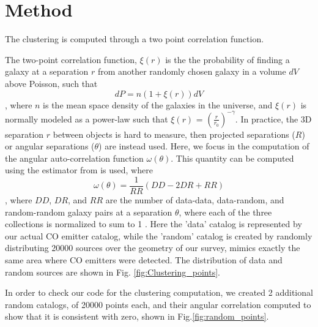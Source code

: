 \section{Method}

The clustering is computed through a two point correlation function. %

The two-point correlation function, $ \xi(r)$ is the the probability of finding a galaxy at a separation $r$ from another randomly chosen galaxy in a volume $dV$ above Poisson, such that $$ dP = n(1 + \xi(r))dV $$, where $n$ is the mean space density of the galaxies in the universe\cite{hickox2011clustering}, and $\xi(r)$ is normally modeled as a power-law such that $\xi(r)$ = $(\frac{r}{r_0})^{-\gamma}$. In practice, the 3D separation $r$ between objects is hard to measure, then projected separations ($R$) or angular separations ($\theta$) are instead used. Here, we focus in the computation of the angular auto-correlation function $\omega(\theta)$. This quantity can be computed using the estimator from \cite{1993ApJ...412...64L} is used, where $$ \omega(\theta) = \frac{1}{RR}(DD-2DR + RR)$$, where $DD$, $DR$, and $RR$ are the number of data-data, data-random, and random-random galaxy pairs at a separation $\theta$, where each of the three collections is normalized to sum to 1 \cite{hickox2011clustering}. Here the 'data' catalog is represented by our actual CO emitter catalog, while the 'random' catalog is created by randomly distributing 20000 sources over the geometry of our survey, mimics exactly the same area where CO emitters were detected. The distribution of data and random sources are shown in Fig. \ref{fig:Clustering_points}.



In order to check our code for the clustering computation, we created 2 additional random catalogs, of 20000 points each, and their angular correlation computed to show that it is consistent with zero, shown in Fig.\ref{fig:random_points}.

